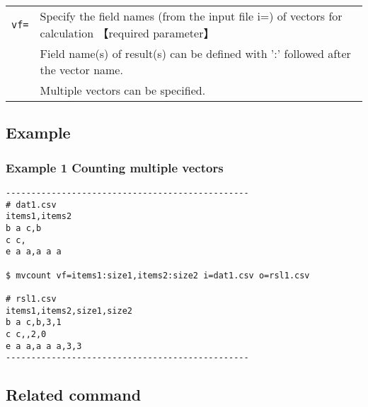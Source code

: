 \documentclass[a4paper]{jarticle}
\begin{document}
\begin{table}[htbp]
{\small
\begin{tabular}{ll}
\verb|vf=| & Specify the field names (from the input file i=) of vectors for calculation  【required parameter】\\
           & Field name(s) of result(s) can be defined with ':' followed after the vector name. \\
           & Multiple vectors can be specified.\\
\end{tabular}
}
\end{table} 

\subsection*{Example}
\subsubsection*{Example 1 Counting multiple vectors }
\begin{verbatim}
------------------------------------------------
# dat1.csv
items1,items2
b a c,b
c c,
e a a,a a a

$ mvcount vf=items1:size1,items2:size2 i=dat1.csv o=rsl1.csv

# rsl1.csv
items1,items2,size1,size2
b a c,b,3,1
c c,,2,0
e a a,a a a,3,3
------------------------------------------------
\end{verbatim}

\subsection*{Related command}
\end{document}
